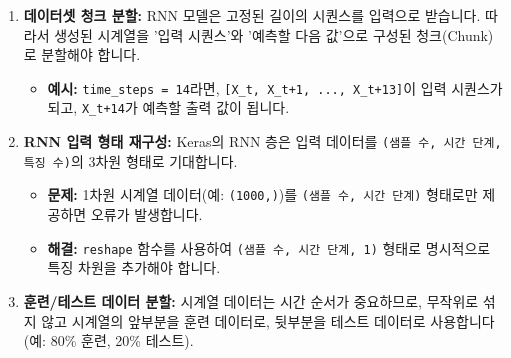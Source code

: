 \documentclass[11pt,a4paper]{article}
\theoremstyle{definition}
\begin{document}
\begin{enumerate}
\begin{lstlisting}[language=Python, caption=GARCH 유사 시계열 생성 함수 (개념 코드), label=lst:garch_like_ts]
    for t in range(1, n_steps):
        # GARCH와 유사한 변동성 업데이트
        volatility[t] = np.sqrt(alpha * series[t-1]**2 + beta * volatility[t-1]**2 + gamma)
        # 비선형 상호작용 항 추가
        series[t] = np.random.normal(0, volatility[t]) + interaction * series[t-1] * volatility[t-1]
    return series, volatility
    \end{lstlisting}
    \item \textbf{데이터셋 청크 분할:}
    RNN 모델은 고정된 길이의 시퀀스를 입력으로 받습니다. 따라서 생성된 시계열을 '입력 시퀀스'와 '예측할 다음 값'으로 구성된 청크(Chunk)로 분할해야 합니다.
    \begin{itemize}
        \item \textbf{예시:} \texttt{time_steps = 14}라면, \texttt{[X_t, X_{t+1}, ..., X_{t+13}]}이 입력 시퀀스가 되고, \texttt{X_{t+14}}가 예측할 출력 값이 됩니다.
    \end{itemize}
    \item \textbf{RNN 입력 형태 재구성:}
    Keras의 RNN 층은 입력 데이터를 \texttt{(샘플 수, 시간 단계, 특징 수)}의 3차원 형태로 기대합니다.
    \begin{itemize}
        \item \textbf{문제:} 1차원 시계열 데이터(예: \texttt{(1000,)})를 \texttt{(샘플 수, 시간 단계)} 형태로만 제공하면 오류가 발생합니다.
        \item \textbf{해결:} \texttt{reshape} 함수를 사용하여 \texttt{(샘플 수, 시간 단계, 1)} 형태로 명시적으로 특징 차원을 추가해야 합니다.
    \end{itemize}
    \item \textbf{훈련/테스트 데이터 분할:}
    시계열 데이터는 시간 순서가 중요하므로, 무작위로 섞지 않고 시계열의 앞부분을 훈련 데이터로, 뒷부분을 테스트 데이터로 사용합니다 (예: 80\% 훈련, 20\% 테스트).
\end{enumerate}
\end{document}

